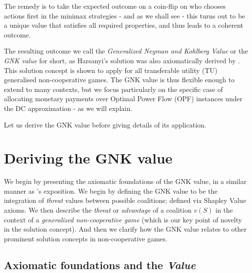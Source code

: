 The remedy is to take the expected outcome on a coin-flip on who chooses actions first in the minimax strategies - and as we shall see - this turns out to be a unique value that satisfies all required properties, and thus leads to a coherent outcome.

The resulting outcome we call the \textit{Generalized Neyman and Kohlberg Value} or the \textit{GNK value} for short, 
as Harsanyi's solution was also axiomatically derived by \cite{value2,KOHLBERG2018139}.
This solution concept is shown to apply for all transferable utility (TU) generalised non-cooperative games.
The GNK value is thus flexible enough to extend to many contexts, but we focus particularly on the specific case of allocating monetary payments over Optimal Power Flow (OPF) instances under the DC approximation - as we will explain.

Let us derive the GNK value before giving details of its application.

\section{Deriving the GNK value}\label{the_value_def2}

We begin by presenting the axiomatic foundations of the GNK value, in a similar manner as \cite{value2}'s exposition.
We begin by defining the GNK value to be the integration of \emph{threat} values between possible coalitions; defined via Shapley Value axioms.
We then describe the \emph{threat} or \emph{advantage} of a coalition $v(S)$ in the context of a \textit{generalized non-cooperative game} (which is our key point of novelty in the solution concept).
And then we clarify how the GNK value relates to other prominent solution concepts in non-cooperative games.

\subsection{Axiomatic foundations and the \textit{Value}}\label{the_value_def}


